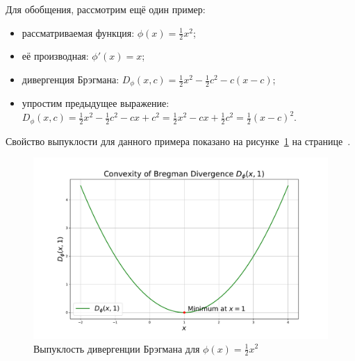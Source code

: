 \documentclass[12pt]{scrartcl}
\begin{document}
Для обобщения, рассмотрим ещё один пример:
\begin{itemize}
    \item рассматриваемая функция: $\phi(x) = \frac{1}{2}x^{2}$;
    \item её производная: $\phi'(x) = x$;
    \item дивергенция Брэгмана: $D_{\phi}(x,c) = \frac{1}{2}x^{2} - \frac{1}{2}c^{2} - c(x-c)$;
    \item упростим предыдущее выражение: $D_{\phi}(x,c) = \frac{1}{2}x^{2} - \frac{1}{2}c^{2} -cx + c^{2} = \frac{1}{2}x^{2} - cx + \frac{1}{2}c^{2} = \frac{1}{2}(x-c)^{2}$.
\end{itemize}

Свойство выпуклости для данного примера показано на рисунке~\ref{fig:convexity_2} на странице~\pageref{fig:convexity_2}.

\begin{figure}[h]
    \centering
    \includegraphics[width=\textwidth]{convexity_2.pdf} %
    \caption{Выпуклость дивергенции Брэгмана для $\phi(x) = \frac{1}{2}x^{2}$}
    \label{fig:convexity_2}
\end{figure}
\end{document}
